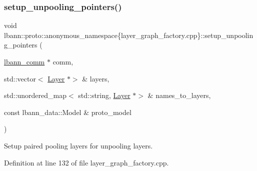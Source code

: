 \subsubsection{\texorpdfstring{setup\+\_\+unpooling\+\_\+pointers()}{setup\_unpooling\_pointers()}}
{\footnotesize\ttfamily void lbann\+::proto\+::anonymous\+\_\+namespace\{layer\+\_\+graph\+\_\+factory.\+cpp\}\+::setup\+\_\+unpooling\+\_\+pointers (\begin{DoxyParamCaption}\item[{\hyperlink{classlbann_1_1lbann__comm}{lbann\+\_\+comm} $\ast$}]{comm,  }\item[{std\+::vector$<$ \hyperlink{classlbann_1_1Layer}{Layer} $\ast$$>$ \&}]{layers,  }\item[{std\+::unordered\+\_\+map$<$ std\+::string, \hyperlink{classlbann_1_1Layer}{Layer} $\ast$$>$ \&}]{names\+\_\+to\+\_\+layers,  }\item[{const lbann\+\_\+data\+::\+Model \&}]{proto\+\_\+model }\end{DoxyParamCaption})}

Setup paired pooling layers for unpooling layers. 

Definition at line 132 of file layer\+\_\+graph\+\_\+factory.\+cpp.


